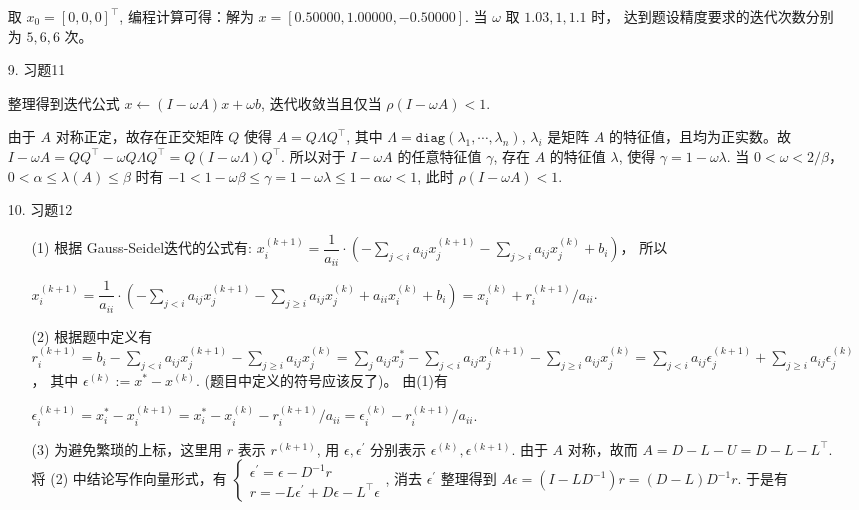 \documentclass{article}
\begin{document}
\begin{spacing}{1.5}
\begin{itemize}
    取 $x_0 = [0, 0, 0]^\top$, 编程计算可得：解为 $x = [0.50000, 1.00000, -0.50000]$. 当 $\omega$ 取 $1.03, 1, 1.1$ 时， 达到题设精度要求的迭代次数分别为 $5,6,6$ 次。

    \item [9.] 习题11
    
    整理得到迭代公式 $x\leftarrow (I-\omega A)x + \omega b$, 迭代收敛当且仅当 $\rho(I-\omega A) < 1$.

    由于 $A$ 对称正定，故存在正交矩阵 $Q$ 使得 $A = Q \Lambda Q^\top$, 其中 $\Lambda = \mathtt{diag}(\lambda_1,\cdots,\lambda_n)$, $\lambda_i$ 是矩阵 $A$ 的特征值，且均为正实数。故 $I - \omega A = QQ^\top - \omega Q\Lambda Q^\top = Q(I - \omega\Lambda)Q^\top$. 所以对于 $I-\omega A$ 的任意特征值 $\gamma$, 存在 $A$ 的特征值 $\lambda$, 使得 $\gamma = 1-\omega\lambda$. 当 $0< \omega < 2/\beta$，$0<\alpha\leq \lambda(A)\leq \beta$ 时有 $-1< 1-\omega\beta\leq\gamma = 1 - \omega\lambda \leq 1-\alpha\omega < 1$, 此时 $\rho(I-\omega A) < 1$.

    \item [10.] 习题12
    
    \begin{itemize}
        \item [(1)] 根据 Gauss-Seidel迭代的公式有: $x^{(k+1)}_i = \dfrac{1}{a_{ii}}\cdot\left(-\sum_{j<i} a_{ij}x^{(k+1)}_j - \sum_{j>i}a_{ij}x^{(k)}_{j} + b_i\right)$， 所以 
        
        $x^{(k+1)}_i = \dfrac{1}{a_{ii}}\cdot\left(-\sum_{j<i} a_{ij}x^{(k+1)}_j - \sum_{j\geq i}a_{ij}x^{(k)}_{j} + a_{ii}x^{(k)}_{i} + b_i\right) = x_{i}^{(k)} + r_i^{(k+1)}/a_{ii}$.

        \item [(2)] 根据题中定义有 $r_i^{(k+1)} = b_i - \sum_{j<i} a_{ij}x^{(k+1)}_j - \sum_{j\geq i} a_{ij}x^{(k)}_j = \sum_j a_{ij}x^*_{j} - \sum_{j<i} a_{ij}x^{(k+1)}_j - \sum_{j\geq i} a_{ij}x^{(k)}_j = \sum_{j<i} a_{ij}\epsilon_j^{(k+1)} +\sum_{j\geq i} a_{ij}\epsilon_j^{(k)}$， 其中 $\epsilon^{(k)} := x^* - x^{(k)}$. (题目中定义的符号应该反了)。 由(1)有 
        
        $\epsilon_i^{(k+1)} = x_i^* - x^{(k+1)}_i = x_i^* - x_i^{(k)} - r_i^{(k+1)}/a_{ii} = \epsilon_i^{(k)} - r^{(k+1)}_i/a_{ii}$. 

        \item [(3)] 为避免繁琐的上标，这里用 $r$ 表示 $r^{(k+1)}$, 用 $\epsilon,\epsilon^\prime$ 分别表示 $\epsilon^{(k)},\epsilon^{(k+1)}$. 由于 $A$ 对称，故而 $A = D - L - U = D - L - L^\top$. 将 (2) 中结论写作向量形式，有
        $\left\{\begin{array}{l}\epsilon^\prime = \epsilon - D^{-1}r\\r = -L\epsilon^\prime + D\epsilon - L^\top \epsilon\end{array}\right.$, 消去 $\epsilon^\prime$ 整理得到 $A\epsilon = (I - LD^{-1})r = (D - L)D^{-1}r$. 于是有 


\end{itemize}
\end{itemize}
\end{spacing}
\end{document}
